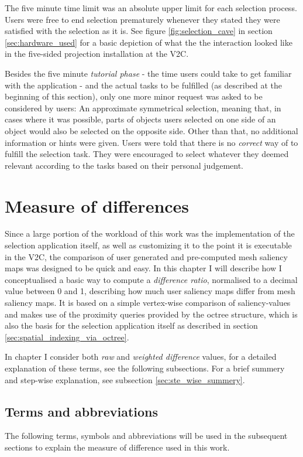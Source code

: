 The five minute time limit was an absolute upper limit for each selection process. Users were free to end selection prematurely whenever they stated they were satisfied with the selection as it is. See figure \ref{fig:selection_cave} in section \ref{sec:hardware_used} for a basic depiction of what the the interaction looked like in the five-sided projection installation at the V2C.

Besides the five minute \textit{tutorial phase} - the time users could take to get familiar with the application - and the actual tasks to be fulfilled (as described at the beginning of this section), only one more minor request was asked to be considered by users: An approximate symmetrical selection, meaning that, in cases where it was possible, parts of objects users selected on one side of an object would also be selected on the opposite side. Other than that, no additional information or hints were given. Users were told that there is no \textit{correct} way of to fulfill the selection task. They were encouraged to select whatever they deemed relevant according to the tasks based on their personal judgement.

	\section {Measure of differences}
	\label{sec:measure_of_difference}
Since a large portion of the workload of this work was the implementation of the selection application itself, as well as customizing it to the point it is executable in the V2C, the comparison of user generated and pre-computed mesh saliency maps was designed to be quick and easy. In this chapter I will describe how I conceptualised a basic way to compute a \textit{difference ratio}, normalised to a decimal value between 0 and 1, describing how much user saliency maps differ from mesh saliency maps. It is based on a simple vertex-wise comparison of saliency-values and makes use of the proximity queries provided by the octree structure, which is also the basis for the selection application itself as described in section \ref{sec:spatial_indexing_via_octree}.

In chapter %
I consider both \textit{raw} and \textit{weighted difference} values, for a detailed explanation of these terms, see the following subsections. For a brief summery and step-wise explanation, see subsection \ref{sec:ste_wise_summery}.

		\subsection{Terms and abbreviations}
		\label{sec:concept_terms_and_abbreviations}
The following terms, symbols and abbreviations will be used in the subsequent sections to explain the measure of difference used in this work.


